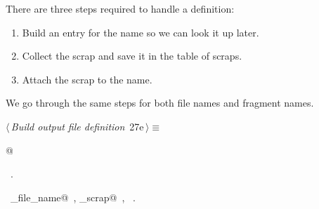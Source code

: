 \documentclass[a4paper]{report}
\begin{document}
There are three steps required to handle a definition:
\begin{enumerate}
  \item Build an entry for the name so we can look it up later.
  \item Collect the scrap and save it in the table of scraps.
  \item Attach the scrap to the name.
\end{enumerate}
We go through the same steps for both file names and fragment names.
\begin{flushleft} \small
\begin{minipage}{\linewidth}\label{scrap44}\raggedright\small
{} $\langle\,${\it Build output file definition}\nobreak\ {\footnotesize {27e}}$\,\rangle\equiv$
\vspace{-1ex}
\begin{list}{}{} \item
\mbox{}@{\NWsep}
\end{list}
\vspace{-1.5ex}
\footnotesize
\begin{list}{}{\setlength{\itemsep}{-\parsep}\setlength{\itemindent}{-\leftmargin}}
\item \NWtxtMacroRefIn\ .
\item \NWtxtIdentsUsed\nobreak\  \verb@collect_file_name@\nobreak\ , \verb@collect_scrap@\nobreak\ , \verb@Name@\nobreak\ .
\item{}
\end{list}
\end{minipage}\vspace{4ex}
\end{flushleft}
\end{document}
